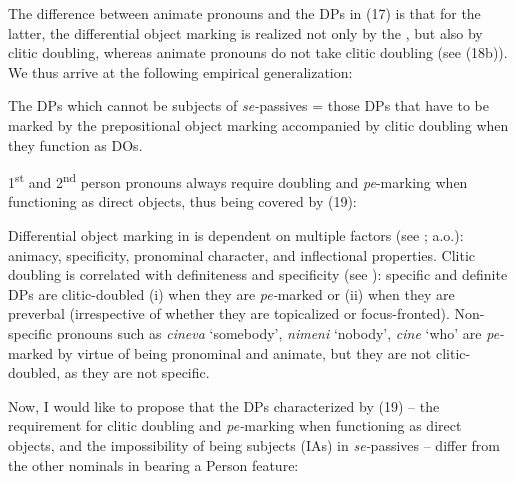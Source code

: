 \documentclass[output=paper]{langsci/langscibook}
\begin{document}
The difference between animate  pronouns and the DPs in (17) is that for the latter, the differential object marking is realized not only by the , but also by clitic doubling, whereas animate  pronouns do not take clitic doubling (see (18b)). We thus arrive at the following empirical generalization:

\ea%
    \label{ex:giurgea:19}
    The DPs which cannot be subjects of \textit{se-}passives = those DPs that have to be marked by the prepositional object marking accompanied by clitic doubling when they function as DOs.
\z

1\textsuperscript{st} and 2\textsuperscript{nd} person pronouns always require doubling and \textit{pe}{}-marking when functioning as direct objects, thus being covered by (19):

\ea%
    \label{ex:giurgea:20}
    \z
\z

Differential object marking in  is dependent on multiple factors (see \citealt{Dobrovie-Sorin1994,Cornilescu2000,Mardale2008,Tigău2010,Tigău2014}; a.o.): animacy, specificity, pronominal character, and inflectional properties. Clitic doubling is correlated with definiteness and specificity (see \citealt{Marchis2013}): specific and definite DPs are clitic-doubled (i) when they are \textit{pe-}marked or (ii) when they are preverbal (irrespective of whether they are topicalized or focus-fronted). Non-specific pronouns such as \textit{cineva} ‘somebody’, \textit{nimeni} ‘nobody’, \textit{cine} ‘who’ are \textit{pe-}marked by virtue of being pronominal and animate, but they are not clitic-doubled, as they are not specific.

Now, I would like to propose that the DPs characterized by (19) – the requirement for clitic doubling and \textit{pe-}marking when functioning as direct objects, and the impossibility of being subjects (IAs) in \textit{se-}passives – differ from the other nominals in bearing a Person feature:
\end{document}
